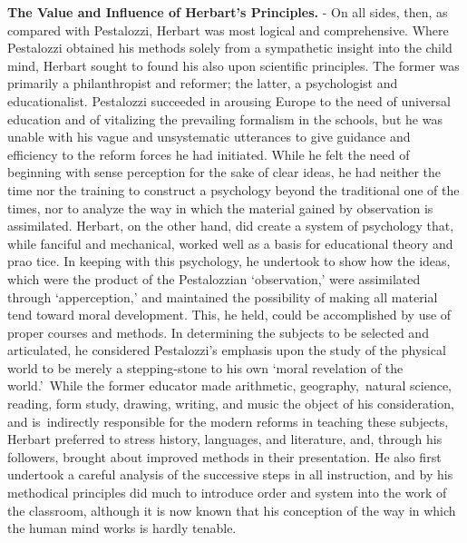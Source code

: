 \documentclass[
]{book}
\begin{document}
\textbf{The Value and Influence of Herbart's Principles.} - On all sides, then, as compared with Pestalozzi, Herbart was most logical and comprehensive. Where Pestalozzi obtained his methods solely from a sympathetic insight into the child mind, Herbart sought to found his also upon scientific principles. The former was primarily a philanthropist and reformer; the latter, a psychologist and educationalist. Pestalozzi succeeded in arousing Europe to the need of universal education and of vitalizing the prevailing formalism in the schools, but he was unable with his vague and unsystematic utterances to give guidance and efficiency to the reform forces he had initiated. While he felt the need of beginning with sense perception for the sake of clear ideas, he had neither the time nor the training to construct a psychology beyond the traditional one of the times, nor to analyze the way in which the material gained by observation is assimilated. Herbart, on the other hand, did create a system of psychology that, while fanciful and mechanical, worked well as a basis for educational theory and prao tice. In keeping with this psychology, he undertook to show how the ideas, which were the product of the Pestalozzian `observation,' were assimilated through `apperception,' and maintained the possibility of making all material tend toward moral development. This, he held, could be accomplished by use of proper courses and methods. In determining the subjects to be selected and articulated, he considered Pestalozzi's emphasis upon the study of the physical world to be merely a stepping-stone to his own `moral revelation of the world.'~While the former educator made arithmetic, geography,~natural science, reading, form study, drawing, writing, and music the object of his consideration, and is~indirectly responsible for the modern reforms in teaching these subjects, Herbart preferred to stress history, languages, and literature, and, through his followers, brought about improved methods in their presentation. He also first undertook a careful analysis of the successive steps in all instruction, and by his methodical principles did much to introduce order and system into the work of the classroom, although it is now known that his conception of the way in which the human mind works is hardly tenable.
\end{document}
